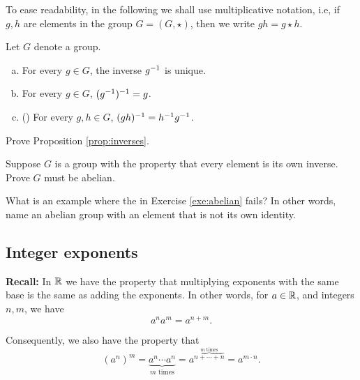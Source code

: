 \documentclass[../algebraNotesMSRI-UP2016.tex]{subfiles}
\begin{document}
\begin{frame}[c]
To ease readability, in the following we shall use multiplicative notation, i.e, if $g,h$ are elements in the group $G=(G,\star)$, then we write $gh=g\star h$.

\smallGap
\begin{prop}\label{prop:inverses}
Let $G$ denote a group. 
\begin{enumerate}[(a)]
\item For every $g\in G$, the inverse $g^{-1}$ is unique.
\item For every $g\in G$, $(g^{-1})^{-1}=g$.
\item ()  For every $g,h\in G$, $(gh)^{-1}=h^{-1}g^{-1}$.
\end{enumerate}
\end{prop}

\smallGap
\begin{exe}[cf. Problem 45]\label{exe:inverses}
Prove Proposition \ref{prop:inverses}.
\end{exe}
\end{frame}

\begin{frame}[c]
\begin{exe}[cf. Problem 46]\label{exe:abelian}
Suppose $G$ is a group with the property that every element is its own inverse.  Prove $G$ must be abelian.
\end{exe}

\smallGap
\begin{que}
What is an example where the  in Exercise \ref{exe:abelian} fails?  In other words, name an abelian group with an element that is not its own identity.
\end{que}
\end{frame}

\subsection[\subsecname]{Integer exponents}\label{subsec:integerExponents}
\begin{frame}[c]{\subsecname}
\textbf{Recall:} In $\mathbb R$ we have the property that multiplying exponents with the same base is the same as adding the exponents.  In other words, for $a\in \mathbb R$, and integers $n,m$, we have 
\begin{equation}\label{eq:expRule1}
a^na^m=a^{n+m}.
\end{equation}

\smallGap
Consequently, we also have the property that
\begin{equation}\label{eq:expRule2}
(a^n)^m=\underbrace{a^n\cdots a^n}_{\text{$m$ times}}=a^{\overbrace{\scriptstyle n+\cdots+n}^{\scriptstyle\text{$m$ times}}}=a^{m\cdot n}.
\end{equation}
\end{frame}
\end{document}
